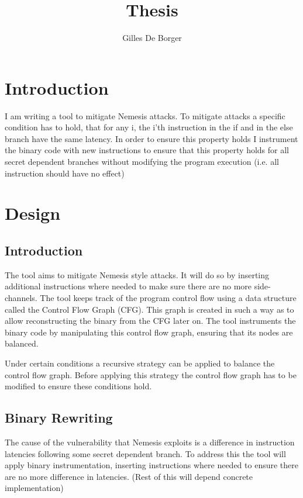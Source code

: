 \documentclass{article}
\author{Gilles De Borger}
\title{Thesis}
\begin{document}
\maketitle
 



\section{Introduction}
I am writing a tool to mitigate Nemesis attacks. To mitigate attacks a specific condition has to hold, that for any i, the i'th instruction in the if 
and in the else branch have the same latency.  In order to ensure this property holds I instrument the binary code with new instructions to ensure that
this property holds for all secret dependent branches without modifying the program execution (i.e. all instruction should have no effect)


\section{Design}		
\subsection{Introduction}
The tool aims to mitigate Nemesis style attacks. It will do so by inserting additional instructions where needed to make sure there are no more side-channels. 
The tool keeps track of the program control flow using a data structure called the Control Flow Graph (CFG). This graph is created in such a way as to allow reconstructing
the binary from the CFG later on. The tool instruments the binary code by manipulating this control flow graph, ensuring that its nodes are balanced.

Under certain conditions a recursive strategy can be applied to balance the control flow graph. Before applying this strategy the control flow graph has to be modified to ensure
these conditions hold. 

\subsection{Binary Rewriting} 
The cause of the vulnerability that Nemesis exploits is a difference in instruction latencies following some secret dependent branch. To address this the tool will apply binary instrumentation, inserting instructions where needed to ensure 
there are no more difference in latencies. (Rest of this will depend concrete implementation)
\end{document}
